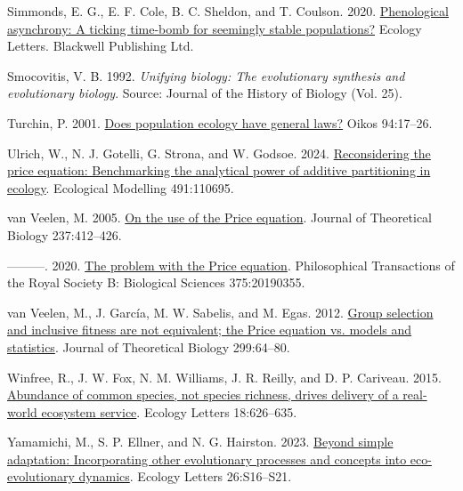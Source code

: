 \documentclass[
]{article}
\newlength{\cslhangindent}
\newenvironment{CSLReferences}[2] %
 {\begin{list}{}{%
  \setlength{\itemindent}{0pt}
  \setlength{\leftmargin}{0pt}
  \setlength{\parsep}{0pt}
  \ifodd #1
   \setlength{\leftmargin}{\cslhangindent}
   \setlength{\itemindent}{-1\cslhangindent}
  \fi
  \setlength{\itemsep}{#2\baselineskip}}}
 {\end{list}}
\begin{document}
\begin{CSLReferences}{1}{0}
Simmonds, E. G., E. F. Cole, B. C. Sheldon, and T. Coulson. 2020.
\href{https://doi.org/10.1111/ele.13603}{Phenological asynchrony: A
ticking time-bomb for seemingly stable populations?} Ecology Letters.
Blackwell Publishing Ltd.

Smocovitis, V. B. 1992. \emph{Unifying biology: The evolutionary
synthesis and evolutionary biology}. Source: Journal of the History of
Biology (Vol. 25).

Turchin, P. 2001.
\href{https://doi.org/10.1034/j.1600-0706.2001.11310.x}{Does population
ecology have general laws?} Oikos 94:17--26.

Ulrich, W., N. J. Gotelli, G. Strona, and W. Godsoe. 2024.
\href{https://doi.org/10.1016/j.ecolmodel.2024.110695}{Reconsidering the
price equation: Benchmarking the analytical power of additive
partitioning in ecology}. Ecological Modelling 491:110695.

van Veelen, M. 2005.
\href{https://doi.org/10.1016/j.jtbi.2005.04.026}{{On the use of the
Price equation}}. Journal of Theoretical Biology 237:412--426.

---------. 2020. \href{https://doi.org/10.1098/rstb.2019.0355}{{The
problem with the Price equation}}. Philosophical Transactions of the
Royal Society B: Biological Sciences 375:20190355.

van Veelen, M., J. García, M. W. Sabelis, and M. Egas. 2012.
\href{https://doi.org/10.1016/j.jtbi.2011.07.025}{{Group selection and
inclusive fitness are not equivalent; the Price equation vs. models and
statistics}}. Journal of Theoretical Biology 299:64--80.

Winfree, R., J. W. Fox, N. M. Williams, J. R. Reilly, and D. P.
Cariveau. 2015. \href{https://doi.org/10.1111/ele.12424}{{Abundance of
common species, not species richness, drives delivery of a real-world
ecosystem service}}. Ecology Letters 18:626--635.

Yamamichi, M., S. P. Ellner, and N. G. Hairston. 2023.
\href{https://doi.org/10.1111/ele.14197}{Beyond simple adaptation:
Incorporating other evolutionary processes and concepts into
eco-evolutionary dynamics}. Ecology Letters 26:S16--S21.

\end{CSLReferences}
\end{document}
